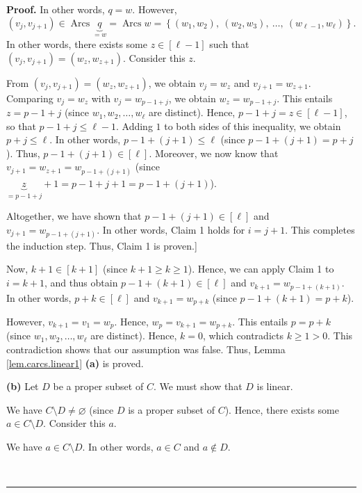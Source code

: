 \documentclass[numbers=enddot,12pt,final,onecolumn,notitlepage]{scrartcl}%
\numberwithin{exer}{section}
\theoremstyle{definition}
\newenvironment{proof}[1][Proof]{\noindent\textbf{#1.} }{\ \rule{0.5em}{0.5em}}
\newenvironment{verlong}{}{}
\begin{document}
\begin{verlong}
\begin{proof}
In other words, $q=w$. However,
\[
\left(  v_{j},v_{j+1}\right)  \in\operatorname*{Arcs}\underbrace{q}%
_{=w}=\operatorname*{Arcs}w=\left\{  \left(  w_{1},w_{2}\right)  ,\ \left(
w_{2},w_{3}\right)  ,\ \ldots,\ \left(  w_{\ell-1},w_{\ell}\right)  \right\}
.
\]
In other words, there exists some $z\in\left[  \ell-1\right]  $ such that
$\left(  v_{j},v_{j+1}\right)  =\left(  w_{z},w_{z+1}\right)  $. Consider this
$z$.

From $\left(  v_{j},v_{j+1}\right)  =\left(  w_{z},w_{z+1}\right)  $, we
obtain $v_{j}=w_{z}$ and $v_{j+1}=w_{z+1}$. Comparing $v_{j}=w_{z}$ with
$v_{j}=w_{p-1+j}$, we obtain $w_{z}=w_{p-1+j}$. This entails $z=p-1+j$ (since
$w_{1},w_{2},\ldots,w_{\ell}$ are distinct). Hence, $p-1+j=z\in\left[
\ell-1\right]  $, so that $p-1+j\leq\ell-1$. Adding $1$ to both sides of this
inequality, we obtain $p+j\leq\ell$. In other words, $p-1+\left(  j+1\right)
\leq\ell$ (since $p-1+\left(  j+1\right)  =p+j$). Thus, $p-1+\left(
j+1\right)  \in\left[  \ell\right]  $. Moreover, we now know that
$v_{j+1}=w_{z+1}=w_{p-1+\left(  j+1\right)  }$ (since $\underbrace{z}%
_{=p-1+j}+1=p-1+j+1=p-1+\left(  j+1\right)  $).

Altogether, we have shown that $p-1+\left(  j+1\right)  \in\left[
\ell\right]  $ and $v_{j+1}=w_{p-1+\left(  j+1\right)  }$. In other words,
Claim 1 holds for $i=j+1$. This completes the induction step. Thus, Claim 1 is
proven.] \medskip

Now, $k+1\in\left[  k+1\right]  $ (since $k+1\geq k\geq1$). Hence, we can
apply Claim 1 to $i=k+1$, and thus obtain $p-1+\left(  k+1\right)  \in\left[
\ell\right]  $ and $v_{k+1}=w_{p-1+\left(  k+1\right)  }$. In other words,
$p+k\in\left[  \ell\right]  $ and $v_{k+1}=w_{p+k}$ (since $p-1+\left(
k+1\right)  =p+k$).

However, $v_{k+1}=v_{1}=w_{p}$. Hence, $w_{p}=v_{k+1}=w_{p+k}$. This entails
$p=p+k$ (since $w_{1},w_{2},\ldots,w_{\ell}$ are distinct). Hence, $k=0$,
which contradicts $k\geq1>0$. This contradiction shows that our assumption was
false. Thus, Lemma \ref{lem.carcs.linear1} \textbf{(a)} is proved. \medskip

\textbf{(b)} Let $D$ be a proper subset of $C$. We must show that $D$ is linear.

We have $C\setminus D\neq\varnothing$ (since $D$ is a proper subset of $C$).
Hence, there exists some $a\in C\setminus D$. Consider this $a$.

We have $a\in C\setminus D$. In other words, $a\in C$ and $a\notin D$.


\end{proof}
\end{verlong}
\end{document}
